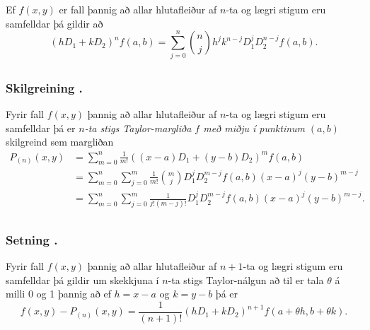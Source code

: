 Ef $f(x,y)$ er fall þannig að allar hlutafleiður af $n$-ta og lægri stigum eru samfelldar þá gildir að 
$$(hD_1+kD_2)^nf(a,b)=\sum_{j=0}^n \textstyle{n\choose j}
h^jk^{n-j}D_1^jD_2^{n-j}f(a,b).$$






\subsection{} 

\subsubsection{Skilgreining \kaflanr.}
Fyrir fall $f(x,y)$ þannig að allar
hlutafleiður af $n$-ta og lægri stigum eru samfelldar þá er {\em $n$-ta
stigs Taylor-margliða $f$ með miðju í punktinum} $(a,b)$ skilgreind sem
margliðan  
\begin{align*}
P_{(n)}(x,y)&= \sum_{m=0}^n \frac{1}{m!}((x-a)D_1+(y-b)D_2)^m f(a,b)\\
&=\sum_{m=0}^n\sum_{j=0}^m \frac{1}{m!}\textstyle{m\choose j}
D_1^jD_2^{m-j}f(a,b)(x-a)^j(y-b)^{m-j}\\
&=\sum_{m=0}^n\sum_{j=0}^m \frac{1}{j!(m-j)!}
D_1^jD_2^{m-j}f(a,b)(x-a)^j(y-b)^{m-j}.
\end{align*}






\subsection{} 

\subsubsection{Setning \kaflanr.}
 Fyrir fall $f(x,y)$ þannig að allar hlutafleiður af $n+1$-ta og lægri stigum eru samfelldar þá gildir um skekkjuna í  $n$-ta stigs Taylor-nálgun að til er tala $\theta$ á milli 0 og 1 þannig að ef $h=x-a$ og $k=y-b$ þá er 
$$f(x,y)-P_{(n)}(x,y)=\frac{1}{(n+1)!}(hD_1+kD_2)^{n+1}
f(a+\theta h, b+\theta k).$$




